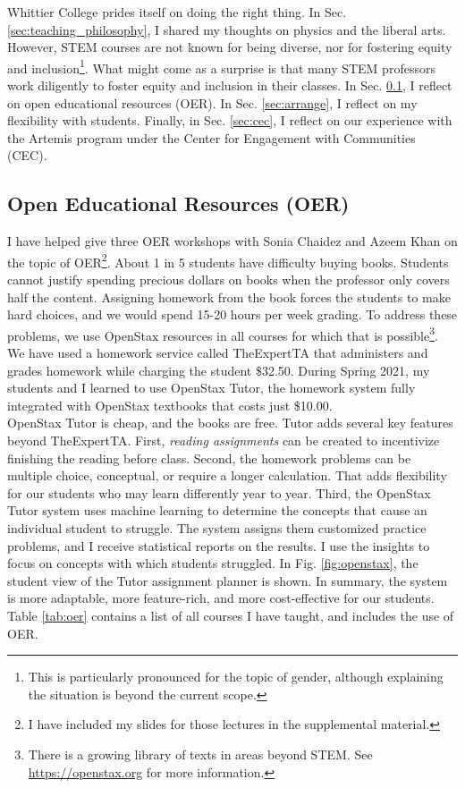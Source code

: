 \documentclass[../../../main.tex]{subfiles}
\begin{document}
Whittier College prides itself on doing the right thing.  In Sec. \ref{sec:teaching_philosophy}, I shared my thoughts on physics and the liberal arts.  However, STEM courses are not known for being diverse, nor for fostering equity and inclusion\footnote{This is particularly pronounced for the topic of gender, although explaining the situation is beyond the current scope.}.  What might come as a surprise is that many STEM professors work diligently to foster equity and inclusion in their classes.  In Sec. \ref{sec:oer}, I reflect on open educational resources (OER).  In Sec. \ref{sec:arrange}, I reflect on my flexibility with students.  Finally, in Sec. \ref{sec:cec}, I reflect on our experience with the Artemis program under the Center for Engagement with Communities (CEC).

\subsection{Open Educational Resources (OER)}
\label{sec:oer}

I have helped give three OER workshops with Sonia Chaidez and Azeem Khan on the topic of OER\footnote{I have included my slides for those lectures in the supplemental material.}.  About 1 in 5 students have difficulty buying books.  Students cannot justify spending precious dollars on books when the professor only covers half the content.  Assigning homework from the book forces the students to make hard choices, and we would spend 15-20 hours per week grading.  To address these problems, we use OpenStax resources in all courses for which that is possible\footnote{There is a growing library of texts in areas beyond STEM.  See \url{https://openstax.org} for more information.}.  We have used a homework service called TheExpertTA that administers and grades homework while charging the student \$32.50.  During Spring 2021, my students and I learned to use OpenStax Tutor, the homework system fully integrated with OpenStax textbooks that costs just \$10.00.
\\
\vspace{0.15cm}
OpenStax Tutor is cheap, and the books are free.  Tutor adds several key features beyond TheExpertTA.  First, \textit{reading assignments} can be created to incentivize finishing the reading before class.  Second, the homework problems can be multiple choice, conceptual, or require a longer calculation.  That adds flexibility for our students who may learn differently year to year.  Third, the OpenStax Tutor system uses machine learning to determine the concepts that cause an individual student to struggle.  The system assigns them customized practice problems, and I receive statistical reports on the results.  I use the insights to focus on concepts with which students struggled.  In Fig. \ref{fig:openstax}, the student view of the Tutor assignment planner is shown.  In summary, the system is more adaptable, more feature-rich, and more cost-effective for our students.  Table \ref{tab:oer} contains a list of all courses I have taught, and includes the use of OER.
\\
\vspace{0.15cm}
\end{document}
